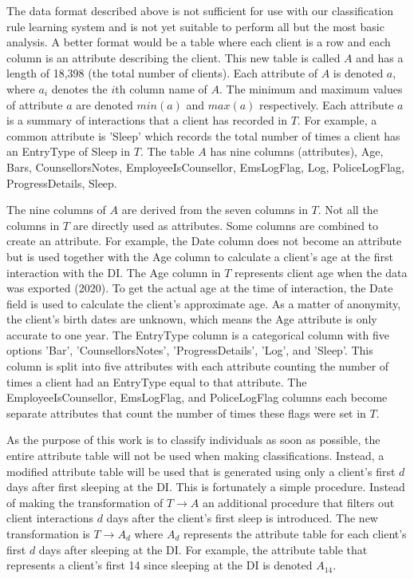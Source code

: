 The data format described above is not sufficient for use with our classification rule learning system and is not yet suitable to perform all but the most basic analysis. A better format would be a table where each client is a row and each column is an attribute describing the client.
This new table is called $A$ and has a length of 18,398 (the total number of clients).
Each attribute of $A$ is denoted $a$, where $a_i$ denotes the $i$th column name of $A$. The minimum and maximum values of attribute $a$ are denoted $min(a)$ and $max(a)$ respectively. Each attribute $a$ is a summary of interactions that a client has recorded in $T$. For example, a common attribute is 'Sleep' which records the total number of times a client has an EntryType of Sleep in $T$.
The table $A$ has nine columns (attributes), Age, Bars, CounsellorsNotes, EmployeeIsCounsellor, EmsLogFlag, Log, PoliceLogFlag, ProgressDetails, Sleep.



The nine columns of $A$ are derived from the seven columns in $T$. Not all the columns in $T$ are directly used as attributes. Some columns are combined to create an attribute. For example, the Date column does not become an attribute but is used together with the Age column to calculate a client's age at the first interaction with the DI.
The Age column in $T$ represents client age when the data was exported (2020). To get the actual age at the time of interaction, the Date field is used to calculate the client's approximate age. As a matter of anonymity, the client's birth dates are unknown, which means the Age attribute is only accurate to one year.
The EntryType column is a categorical column with five options 'Bar', 'CounsellorsNotes', 'ProgressDetails', 'Log', and 'Sleep'. This column is split into five attributes with each attribute counting the number of times a client had an EntryType equal to that attribute.
The EmployeeIsCounsellor, EmsLogFlag, and PoliceLogFlag columns each become separate attributes that count the number of times these flags were set in $T$.


As the purpose of this work is to classify individuals as soon as possible, the entire attribute table will not be used when making classifications. Instead, a modified attribute table will be used that is generated using only a client's first $d$ days after first sleeping at the DI. 
This is fortunately a simple procedure. Instead of making the transformation of $T \rightarrow A$ an additional procedure that filters out client interactions $d$ days after the client's first sleep is introduced. The new transformation is $T \rightarrow A_d$ where $A_d$ represents the attribute table for each client's first $d$ days after sleeping at the DI. For example, the attribute table that represents a client's first 14 since sleeping at the DI is denoted $A_{14}$.


